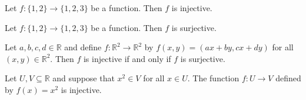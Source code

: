 \begin{chapex} %
Let $f : \{ 1, 2 \} \to \{ 1, 2, 3 \}$ be a function. Then $f$ is injective.
\end{chapex}

\begin{chapex} %
Let $f : \{ 1, 2 \} \to \{ 1, 2, 3 \}$ be a function. Then $f$ is surjective.
\end{chapex}

\begin{chapex} %
Let $a,b,c,d \in \mathbb{R}$ and define $f : \mathbb{R}^2 \to \mathbb{R}^2$ by $f(x,y) = (ax+by,cx+dy)$ for all $(x,y) \in \mathbb{R}^2$. Then $f$ is injective if and only if $f$ is surjective.
\end{chapex}

\begin{chapex} %
\label{cqFunctionsASNEnd}
Let $U, V \subseteq \mathbb{R}$ and suppose that $x^2 \in V$ for all $x \in U$. The function $f : U \to V$ defined by $f(x) = x^2$ is injective.
\end{chapex}